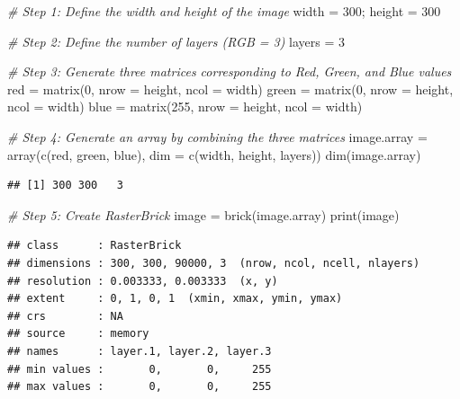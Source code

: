 \documentclass[
  12pt,
]{style/krantz}
\newenvironment{Shaded}{\begin{snugshade}}{\end{snugshade}}
\newcommand{\AttributeTok}[1]{\textcolor[rgb]{0.77,0.63,0.00}{#1}}
\newcommand{\CommentTok}[1]{\textcolor[rgb]{0.56,0.35,0.01}{\textit{#1}}}
\newcommand{\DecValTok}[1]{\textcolor[rgb]{0.00,0.00,0.81}{#1}}
\newcommand{\FunctionTok}[1]{\textcolor[rgb]{0.00,0.00,0.00}{#1}}
\newcommand{\NormalTok}[1]{#1}
\newcommand{\OtherTok}[1]{\textcolor[rgb]{0.56,0.35,0.01}{#1}}
\begin{document}
\begin{Shaded}
\begin{Highlighting}[]
\CommentTok{\# Step 1: Define the width and height of the image}
\NormalTok{width }\OtherTok{=} \DecValTok{300}\NormalTok{; }
\NormalTok{height }\OtherTok{=} \DecValTok{300}

\CommentTok{\# Step 2: Define the number of layers (RGB = 3)}
\NormalTok{layers }\OtherTok{=} \DecValTok{3}

\CommentTok{\# Step 3: Generate three matrices corresponding to Red, Green, and Blue values}
\NormalTok{red }\OtherTok{=} \FunctionTok{matrix}\NormalTok{(}\DecValTok{0}\NormalTok{, }\AttributeTok{nrow =}\NormalTok{ height, }\AttributeTok{ncol =}\NormalTok{ width)}
\NormalTok{green }\OtherTok{=} \FunctionTok{matrix}\NormalTok{(}\DecValTok{0}\NormalTok{, }\AttributeTok{nrow =}\NormalTok{ height, }\AttributeTok{ncol =}\NormalTok{ width)}
\NormalTok{blue }\OtherTok{=} \FunctionTok{matrix}\NormalTok{(}\DecValTok{255}\NormalTok{, }\AttributeTok{nrow =}\NormalTok{ height, }\AttributeTok{ncol =}\NormalTok{ width)}

\CommentTok{\# Step 4: Generate an array by combining the three matrices}
\NormalTok{image.array }\OtherTok{=} \FunctionTok{array}\NormalTok{(}\FunctionTok{c}\NormalTok{(red, green, blue), }\AttributeTok{dim =} \FunctionTok{c}\NormalTok{(width, height, layers))}
\FunctionTok{dim}\NormalTok{(image.array)}
\end{Highlighting}
\end{Shaded}

\begin{verbatim}
## [1] 300 300   3
\end{verbatim}

\begin{Shaded}
\begin{Highlighting}[]
\CommentTok{\# Step 5: Create RasterBrick}
\NormalTok{image }\OtherTok{=} \FunctionTok{brick}\NormalTok{(image.array)}
\FunctionTok{print}\NormalTok{(image)}
\end{Highlighting}
\end{Shaded}

\begin{verbatim}
## class      : RasterBrick 
## dimensions : 300, 300, 90000, 3  (nrow, ncol, ncell, nlayers)
## resolution : 0.003333, 0.003333  (x, y)
## extent     : 0, 1, 0, 1  (xmin, xmax, ymin, ymax)
## crs        : NA 
## source     : memory
## names      : layer.1, layer.2, layer.3 
## min values :       0,       0,     255 
## max values :       0,       0,     255
\end{verbatim}
\end{document}
